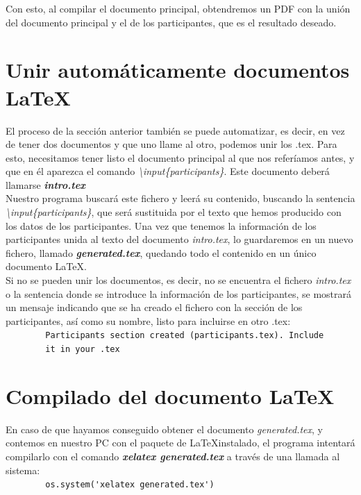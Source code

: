 \documentclass[a4paper, 12pt]{book}
\begin{document}
Con esto, al compilar el documento principal, obtendremos un PDF con la unión del documento principal y el de los participantes, que es el resultado deseado.


\section{Unir automáticamente documentos \LaTeX}
\label{sec:uneLatex}
El proceso de la sección anterior también se puede automatizar, es decir, en vez de tener dos documentos y que uno llame al otro, podemos unir los .tex. Para esto, necesitamos tener listo el documento principal al que nos referíamos antes, y que en él aparezca el comando \mbox{\textit{\textbackslash input\{participants\}}}. Este documento deberá llamarse \textbf{\textit{intro.tex}}\\

Nuestro programa buscará este fichero y leerá su contenido, buscando la sentencia \mbox{\textit{\textbackslash input\{participants\}}}, que será sustituida por el texto que hemos producido con los datos de los participantes. Una vez que tenemos la información de los participantes unida al texto del documento \textit{intro.tex}, lo guardaremos en un nuevo fichero, llamado \textbf{\textit{generated.tex}}, quedando todo el contenido en un único documento \LaTeX.\\

Si no se pueden unir los documentos, es decir, no se encuentra el fichero \textit{intro.tex} o la sentencia donde se introduce la información de los participantes, se mostrará un mensaje indicando que se ha creado el fichero con la sección de los participantes, así como su nombre, listo para incluirse en otro .tex:\\
\verb"        Participants section created (participants.tex). Include"\\
\verb"        it in your .tex"



\section{Compilado del documento \LaTeX}
\label{sec:compilado}
En caso de que hayamos conseguido obtener el documento \textit{generated.tex}, y contemos en nuestro PC con el paquete de \LaTeX instalado, el programa intentará compilarlo con el comando \textbf{\textit{xelatex generated.tex}} a través de una llamada al sistema:\\
\verb"        os.system('xelatex generated.tex')"\\
\end{document}
